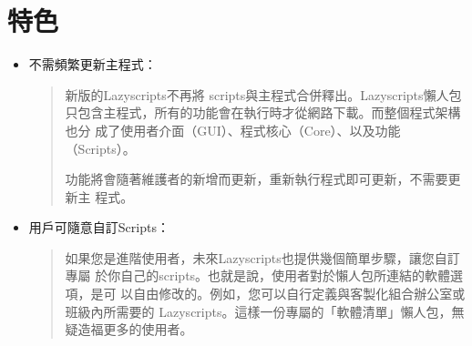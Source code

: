 \documentclass[letterpaper,10pt,english]{manual}
\begin{document}
\section{特色}
\begin{itemize}
\item {} 
不需頻繁更新主程式：
\begin{quote}

新版的Lazyscripts不再將 scripts與主程式合併釋出。Lazyscripts懶人包
只包含主程式，所有的功能會在執行時才從網路下載。而整個程式架構也分
成了使用者介面（GUI）、程式核心（Core）、以及功能（Scripts）。

功能將會隨著維護者的新增而更新，重新執行程式即可更新，不需要更新主
程式。
\end{quote}

\item {} 
用戶可隨意自訂Scripts：
\begin{quote}

如果您是進階使用者，未來Lazyscripts也提供幾個簡單步驟，讓您自訂專屬
於你自己的scripts。也就是說，使用者對於懶人包所連結的軟體選項，是可
以自由修改的。例如，您可以自行定義與客製化組合辦公室或班級內所需要的
Lazyscripts。這樣一份專屬的「軟體清單」懶人包，無疑造福更多的使用者。
\end{quote}

\end{itemize}
\end{document}
